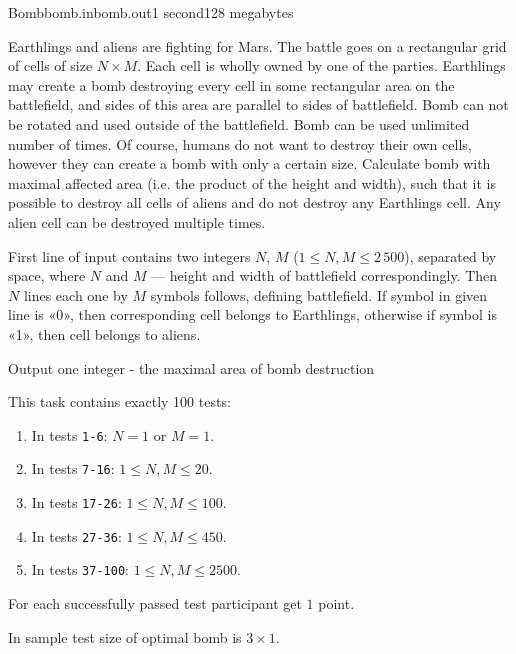 \begin{problem}{Bomb}{bomb.in}{bomb.out}{1 second}{128 megabytes}

Earthlings and aliens are fighting for Mars. The battle goes on a rectangular grid of cells of size $N \times M$. Each cell is wholly owned by one of the parties. Earthlings may create a bomb destroying every cell in some rectangular area on the battlefield, and sides of this area are parallel to sides of battlefield. Bomb can not be rotated and used outside of the battlefield. Bomb can be used unlimited number of times. Of course, humans do not want to destroy their own cells, however they can create a bomb with only a certain size. Calculate bomb with maximal affected area (i.e. the product of the height and width), such that it is possible to destroy all cells of aliens and do not destroy any Earthlings cell. Any alien cell can be destroyed multiple times.

\InputFile
First line of input contains two integers $N$, $M$ ($1 \leq N,M \leq 2\,500$), separated by space, where $N$ and $M$ — height and width of battlefield correspondingly. Then $N$ lines each one by $M$ symbols follows, defining battlefield. If symbol in given line is «0», then corresponding cell belongs to Earthlings, otherwise if symbol is «1», then cell belongs to aliens.

\OutputFile
Output one integer -  the maximal area of bomb destruction 

\Scoring
This task contains exactly 100 tests:
\begin{enumerate}
\item In tests \texttt{1-6}: $N = 1$ or $M = 1$.
\item In tests \texttt{7-16}: $1 \leq N,M \leq 20$.
\item In tests \texttt{17-26}: $1 \leq N,M \leq 100$.
\item In tests \texttt{27-36}: $1 \leq N,M \leq 450$.
\item In tests \texttt{37-100}: $1 \leq N,M \leq 2500$.
\end{enumerate}

For each successfully passed test participant get $1$ point.

\Example

\begin{example}
%
\end{example}

\Note
In sample test size of optimal bomb is $3 \times 1$.

\end{problem}

